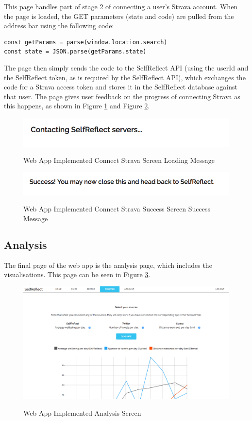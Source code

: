 \documentclass[11pt,openright,a4paper]{report}
\begin{document}
This page handles part of stage 2 of connecting a user's Strava account. When the page is loaded, the GET parameters (state and code) are pulled from the address bar using the following code:
\begin{lstlisting}
const getParams = parse(window.location.search)
const state = JSON.parse(getParams.state)
\end{lstlisting}

The page then simply sends the code to the SelfReflect API (using the userId and the SelfReflect token, as is required by the SelfReflect API), which exchanges the code for a Strava access token and stores it in the SelfReflect database against that user. The page gives user feedback on the progress of connecting Strava as this happens, as shown in Figure \ref{fig:webstravaloading} and Figure \ref{fig:webstravasuccess}.

\begin{figure}[ht]
\centering
\caption{Web App Implemented Connect Strava Screen Loading Message}
\includegraphics[width=.75\textwidth]{i/webstravaloading.png}
\label{fig:webstravaloading}
\end{figure}

\begin{figure}[ht]
\centering
\caption{Web App Implemented Connect Strava Success Screen Success Message}
\includegraphics[width=.75\textwidth]{i/webstravasuccess.png}
\label{fig:webstravasuccess}
\end{figure}

\subsection{Analysis}
The final page of the web app is the analysis page, which includes the visualisations. This page can be seen in Figure \ref{fig:webanalysisimpl}.

\begin{figure}[ht]
\centering
\caption{Web App Implemented Analysis Screen}
\includegraphics[width=.75\textwidth]{i/webanalysisimpl.png}
\label{fig:webanalysisimpl}
\end{figure}
\end{document}
